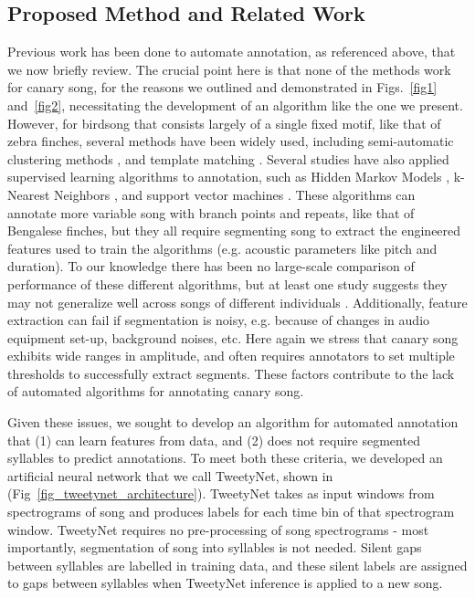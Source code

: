 \documentclass[10pt,letterpaper]{article}
\begin{document}
\subsection*{Proposed Method and Related Work}
\label{Related work}
Previous work has been done to automate annotation, as referenced above, 
that we now briefly review.
The crucial point here is that none of the methods work for canary song, for the 
reasons we outlined and demonstrated in Figs.~\ref{fig1} and~\ref{fig2}, necessitating the 
development of an algorithm like the one we present.
However, for birdsong that consists largely of a single fixed motif, like that of zebra finches,
several methods have been widely used, including semi-automatic clustering methods 
\cite{burkett2015voice,daou2012computational},
and template matching \cite{anderson1996template,yamahachi_undirected_2020,pearre_fast_2017}. 
Several studies have also applied supervised learning algorithms
to annotation, such as Hidden Markov Models \cite{kogan1998automated},
k-Nearest Neighbors \cite{songbrowser}, 
and support vector machines \cite{tachibana2014semi}.
These algorithms can annotate more variable song with branch points and repeats, 
like that of Bengalese finches, 
but they all require segmenting song to extract the engineered features 
used to train the algorithms (e.g. acoustic parameters like pitch and duration).
To our knowledge there has been no large-scale comparison 
of performance of these different algorithms, 
but at least one study suggests they may not generalize well across songs of different 
individuals \cite{nicholson2016comparison}. 
Additionally, feature extraction can fail if segmentation is noisy, 
e.g. because of changes in audio equipment set-up, background noises, etc.
Here again we stress that canary song exhibits wide ranges in amplitude, 
and often requires annotators to set multiple thresholds to successfully extract segments. 
These factors contribute to the lack of automated algorithms for annotating canary song.

Given these issues, we sought to develop an algorithm for automated annotation 
that (1) can learn features from data, and 
(2) does not require segmented syllables to predict annotations.
To meet both these criteria, we developed an artificial neural network 
that we call TweetyNet, shown in (Fig~\ref{fig_tweetynet_architecture}).
TweetyNet takes as input windows from spectrograms of song 
and produces labels for each time bin of that spectrogram window.
TweetyNet requires no pre-processing of song spectrograms - most importantly,  segmentation of song into syllables is not needed. Silent gaps between syllables are labelled in training data, and these silent labels are assigned to gaps between syllables when TweetyNet inference is applied to a new song. 
\end{document}
